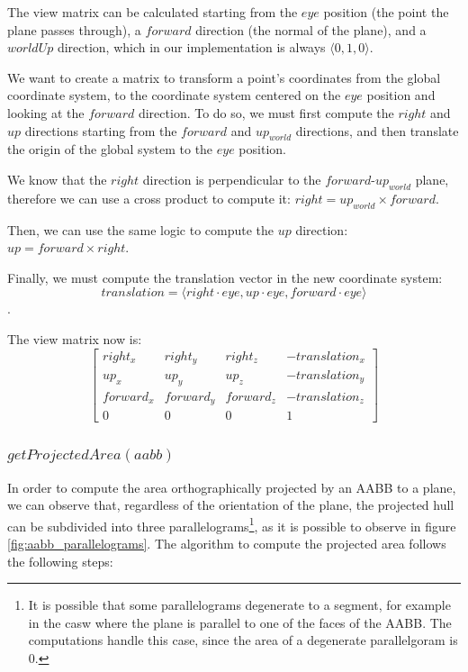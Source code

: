 \documentclass{PoliMi_MasterThesis}
\begin{document}
The view matrix can be calculated starting from the $eye$ position (the point the plane passes through), a $forward$ direction (the normal of the plane), and a $worldUp$ direction, which in our implementation is always $\langle 0, 1, 0 \rangle$.

We want to create a matrix to transform a point's coordinates from the global coordinate system, to the coordinate system centered on the $eye$ position and looking at the $forward$ direction. To do so, we must first compute the $right$ and $up$ directions starting from the $forward$ and $up_{world}$ directions, and then translate the origin of the global system to the $eye$ position.

We know that the $right$ direction is perpendicular to the $forward$-$up_{world}$ plane, therefore we can use a cross product to compute it: $right = up_{world} \times forward$.

Then, we can use the same logic to compute the $up$ direction: $up = forward \times right$.

Finally, we must compute the translation vector in the new coordinate system: $$translation = \langle right \cdot eye, up \cdot eye, forward \cdot eye \rangle$$.

The view matrix now is:
\begin{equation}
	\begin{bmatrix}
		right_x & right_y & right_z & -translation_x \\
		up_x & up_y & up_z & -translation_y \\
		forward_x & forward_y & forward_z & -translation_z \\
		0 & 0 & 0 & 1
	\end{bmatrix}
\end{equation}

\subsubsection*{$getProjectedArea(aabb)$}
In order to compute the area orthographically projected by an AABB to a plane, we can observe that, regardless of the orientation of the plane, the projected hull can be subdivided into three parallelograms\footnote{It is possible that some parallelograms degenerate to a segment, for example in the casw where the plane is parallel to one of the faces of the AABB. The computations handle this case, since the area of a degenerate parallelgoram is 0.}, as it is possible to observe in figure \ref{fig:aabb_parallelograms}. The algorithm to compute the projected area follows the following steps:
\end{document}
